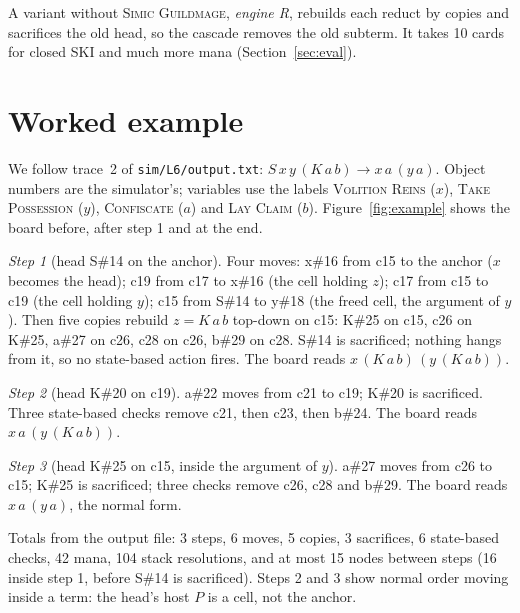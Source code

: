 \documentclass[11pt]{article}
\theoremstyle{definition}
\newcommand{\card}[1]{{\mdseries\scshape #1}}
\begin{document}
A variant without \card{Simic Guildmage}, \emph{engine R}, rebuilds each reduct by copies
and sacrifices the old head, so the cascade removes the old subterm. It takes 10 cards for
closed SKI and much more mana (Section~\ref{sec:eval}).

\section{Worked example}\label{sec:example}

We follow trace~2 of \texttt{sim/L6/output.txt}: $S\,x\,y\,(K\,a\,b) \to x\,a\,(y\,a)$.
Object numbers are the simulator's; variables use the labels \card{Volition Reins} ($x$),
\card{Take Possession} ($y$), \card{Confiscate} ($a$) and \card{Lay Claim} ($b$).
Figure~\ref{fig:example} shows the board before, after step 1 and at the end.

\emph{Step 1} (head S\#14 on the anchor). Four moves:
x\#16 from c15 to the anchor ($x$ becomes the head);
c19 from c17 to x\#16 (the cell holding $z$);
c17 from c15 to c19 (the cell holding $y$);
c15 from S\#14 to y\#18 (the freed cell, the argument of $y$).
Then five copies rebuild $z = K\,a\,b$ top-down on c15: K\#25 on c15, c26 on K\#25,
a\#27 on c26, c28 on c26, b\#29 on c28. S\#14 is sacrificed; nothing hangs from it, so no
state-based action fires. The board reads $x\,(K\,a\,b)\,(y\,(K\,a\,b))$.

\emph{Step 2} (head K\#20 on c19). a\#22 moves from c21 to c19; K\#20 is sacrificed. Three
state-based checks remove c21, then c23, then b\#24. The board reads $x\,a\,(y\,(K\,a\,b))$.

\emph{Step 3} (head K\#25 on c15, inside the argument of $y$). a\#27 moves from c26 to
c15; K\#25 is sacrificed; three checks remove c26, c28 and b\#29. The board reads
$x\,a\,(y\,a)$, the normal form.

Totals from the output file: 3 steps, 6 moves, 5 copies, 3 sacrifices, 6 state-based
checks, 42 mana, 104 stack resolutions, and at most 15 nodes between steps (16 inside
step 1, before S\#14 is sacrificed). Steps 2 and 3 show normal order moving inside a term:
the head's host $P$ is a cell, not the anchor.
\end{document}
